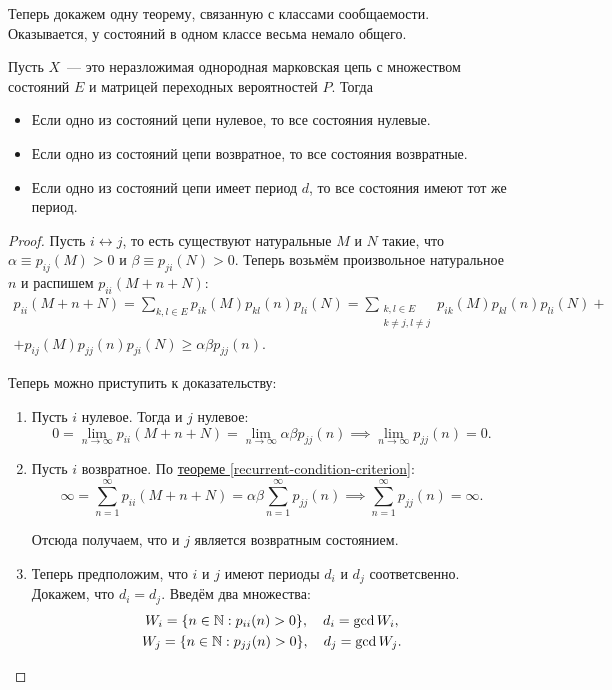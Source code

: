 Теперь докажем одну теорему, связанную с классами сообщаемости. Оказывается, у 
состояний в одном классе весьма немало общего.
\begin{theorem}
	Пусть \(X\)~--- это неразложимая однородная марковская цепь с множеством 
	состояний \(E\) и матрицей переходных вероятностей \(P\). Тогда
	\begin{itemize}
		\item Если одно из состояний цепи нулевое, то все состояния нулевые.
		\item Если одно из состояний цепи возвратное, то все состояния 
		возвратные.
		\item Если одно из состояний цепи имеет период \(d\), то все состояния 
		имеют тот же период.
	\end{itemize}
\end{theorem}
\begin{proof}
	Пусть \(i \leftrightarrow j\), то есть существуют натуральные \(M\) и \(N\) 
	такие, что \(\alpha \equiv p_{ij}(M) > 0\) и \(\beta \equiv p_{ji}(N) > 
	0\). Теперь возьмём произвольное натуральное \(n\) и распишем \(p_{ii}(M + 
	n + N)\):
	\begin{multline*}
		p_{ii}(M + n + N) = \sum_{k, l \in E} p_{ik}(M)p_{kl}(n)p_{li}(N) = 
		\sum_{\substack{k,l \in E \\ k \neq j, l \neq j}} 
		p_{ik}(M)p_{kl}(n)p_{li}(N) + \\ + p_{ij}(M)p_{jj}(n)p_{ji}(N) \geq 
		\alpha \beta p_{jj}(n).
	\end{multline*}
	
	Теперь можно приступить к доказательству:
	\begin{enumerate}
		\item Пусть \(i\) нулевое. Тогда и \(j\) нулевое:
		\[
			0 = \lim\limits_{n \to \infty} p_{ii}(M + n + N) = \lim\limits_{n 
			\to \infty} \alpha \beta p_{jj}(n) \implies \lim\limits_{n \to 
			\infty} p_{jj}(n) = 0.
		\]
		
		\item Пусть \(i\) возвратное. По 
		\hyperref[recurrent-condition-criterion]{теореме 
		\ref*{recurrent-condition-criterion}}:
		\[
			\infty = \sum_{n = 1}^{\infty} p_{ii}(M + n + N) = 
			\alpha\beta\sum_{n = 1}^{\infty} p_{jj}(n) \implies \sum_{n = 
			1}^{\infty} p_{jj}(n) = \infty.
		\]
		
		Отсюда получаем, что и \(j\) является возвратным состоянием.
		
		\item Теперь предположим, что \(i\) и \(j\) имеют периоды \(d_{i}\) и 
		\(d_{j}\) соответсвенно. Докажем, что \(d_{i} = d_{j}\). Введём два 
		множества:
		\begin{gather}
			W_{i} = \{n \in \mathbb{N}: p_{ii}(n) > 0\}, \quad d_{i} = \gcd{W_{i}}, \\
			W_{j} = \{n \in \mathbb{N}: p_{jj}(n) > 0\}, \quad d_{j} = \gcd{W_{j}}.
		\end{gather}
		

\end{enumerate}
\end{proof}
